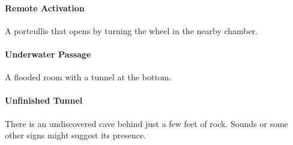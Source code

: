 \documentclass[itdr/core]{subfiles}
\begin{document}
\vfill
\paragraph{Remote Activation}
A portcullis that opens by turning the wheel in the nearby chamber.

\vfill
\paragraph{Underwater Passage}
A flooded room with a tunnel at the bottom.

\vfill
\paragraph{Unfinished Tunnel}
There is an undiscovered cave behind just a few feet of rock. Sounds or some other signs might suggest its presence.

\vfill
\end{document}
